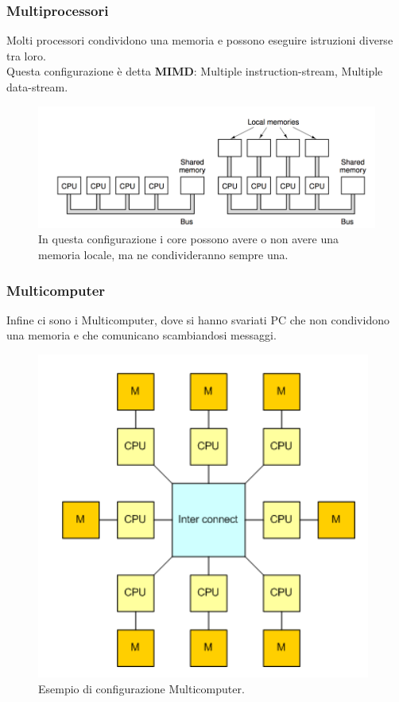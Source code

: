 \documentclass[12pt]{article}
\begin{document}
\subsubsection{Multiprocessori}
Molti processori condividono una memoria e possono eseguire istruzioni diverse tra loro.\\
Questa configurazione è detta \textbf{MIMD}: Multiple instruction-stream, Multiple data-stream.
\begin{figure}[!htb]
    \centering
    \includegraphics[width=1\textwidth, height=.7\textheight,keepaspectratio]{organizzazione_elab/multicore.png} %
    \begin{center}
        \caption{\label{fig:multicore}In questa configurazione i core possono avere o non avere una memoria locale, ma ne condivideranno sempre una.} %
    \end{center}
\end{figure}
\pagebreak
\subsubsection{Multicomputer}
Infine ci sono i Multicomputer, dove si hanno svariati PC che non condividono una memoria e che comunicano scambiandosi messaggi.
\begin{figure}[!htb]
    \centering
    \includegraphics[width=.7\textwidth, height=.7\textheight,keepaspectratio]{organizzazione_elab/multicomputer.png} %
    \begin{center}
        \caption{\label{fig:multicomputer}Esempio di configurazione Multicomputer.} %
    \end{center}
\end{figure}
\pagebreak
\end{document}

